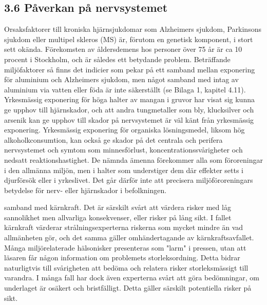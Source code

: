 \subsection*{3.6 Påverkan på nervsystemet}
Orsaksfaktorer till kroniska hjärnsjukdomar som Alzheimers sjukdom, Parkinsons sjukdom eller multipel skleros (MS) är, förutom en genetisk komponent, i stort sett okända. Förekomsten av åldersdemens hos personer över 75 år är ca 10 procent i Stockholm, och är således ett betydande problem.
Beträffande miljöfaktorer så finns det indicier som pekar på ett samband mellan exponering för aluminium och Alzheimers sjukdom, men något samband med intag av aluminium via vatten eller föda är inte säkerställt (se Bilaga 1, kapitel 4.11).
Yrkesmässig exponering för höga halter av mangan i gruvor har visat sig kunna ge upphov till hjärnskador, och att andra tungmetaller som bly, klucksilver och arsenik kan ge upphov till skador på nervsystemet är väl känt från yrkesmässig exponering. Yrkesmässig exponering för organiska lösningsmedel, liksom hög alkoholkconsumtion, kan också ge skador på det centrala och perifera nervsystemet och symtom som minnesförlust, koncentrationssvårigheter och nedsatt reaktionshastighet.
De nämnda ämenna förekommer alla som föroreningar i den allmänna miljön, men i halter som understiger dem där effekter setts i djurförsök eller i yrkeslivet. Det går därför inte att precisera miljöföroreningars betydelse för nerv- eller hjärnskador i befolkningen.

samband med kärnkraft. Det är särskilt svårt att värdera risker med låg sannolikhet men allvarliga konsekvenser, eller risker på lång sikt. I fallet kärnkraft värderar strålningsexperterna riskerna som mycket mindre än vad allmänheten gör, och det samma gäller omhändertagande av kärnkraftsavfallet.
Många miljörelaterade hälsonisker presenteras som "larm" i pressen, utan att läsaren får någon information om problemets storleksordning. Detta bidrar naturligtvis till svårigheten att bedöma och relatera risker storleksmässigt till varandra. I många fall har dock även experterna svårt att göra bedömningar, om underlaget är osäkert och bristfälligt. Detta gäller särskilt potentiella risker på sikt.
